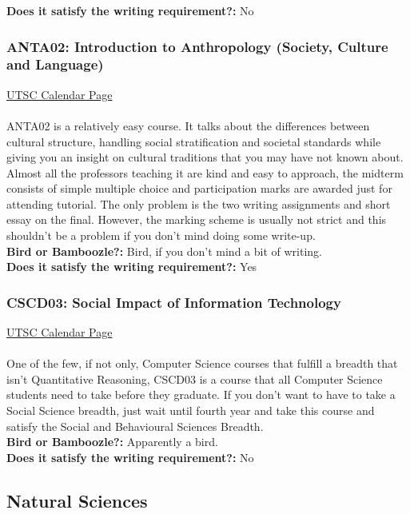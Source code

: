 \documentclass[11pt]{article}
\begin{document}
\textbf{Does it satisfy the writing requirement?:} No

\subsubsection{ANTA02: Introduction to Anthropology (Society, Culture and Language)}
\href{https://utsc.calendar.utoronto.ca/course/ANTA02H3}{UTSC Calendar Page}\\\\
ANTA02 is a relatively easy course. It talks about the differences between cultural structure, handling social stratification and societal standards while giving you an insight on cultural traditions that you may have not known about. Almost all the professors teaching it are kind and easy to approach, the midterm consists of simple multiple choice and participation marks are awarded just for attending tutorial. The only problem is the two writing assignments and short essay on the final. However, the marking scheme is usually not strict and this shouldn't be a problem if you don't mind doing some write-up.\\

\textbf{Bird or Bamboozle?:} Bird, if you don't mind a bit of writing.\\

\textbf{Does it satisfy the writing requirement?:} Yes


\subsubsection{CSCD03: Social Impact of Information Technology}
\href{https://utsc.calendar.utoronto.ca/course/CSCD03H3}{UTSC Calendar Page}\\\\
One of the few, if not only, Computer Science courses that fulfill a breadth that isn't Quantitative Reasoning, CSCD03 is a course that all Computer Science students need to take before they graduate.  If you don't want to have to take a Social Science breadth, just wait until fourth year and take this course and satisfy the Social and Behavioural Sciences Breadth.\\

\textbf{Bird or Bamboozle?:} Apparently a bird.\\

\textbf{Does it satisfy the writing requirement?:} No

\subsection{Natural Sciences}
\end{document}
